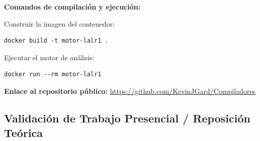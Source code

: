 \documentclass[12pt, letterpaper]{article}
\begin{document}
\textbf{Comandos de compilación y ejecución:}

Construir la imagen del contenedor:
\begin{lstlisting}[style=bashstyle]
docker build -t motor-lalr1 .
\end{lstlisting}
Ejecutar el motor de análisis:
\begin{lstlisting}[style=bashstyle]
docker run --rm motor-lalr1
\end{lstlisting}

\textbf{Enlace al repositorio público:} 
\url{https://github.com/KevinJGard/Compiladores}

\newpage
\subsection*{Validación de Trabajo Presencial / Reposición Teórica}
\end{document}
